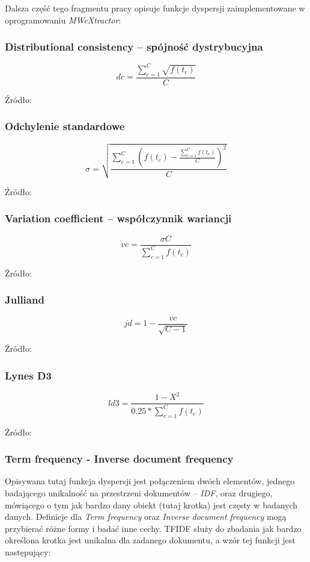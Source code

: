Dalsza część tego fragmentu pracy opisuje funkcje dyspersji zaimplementowane w oprogramowaniu \emph{MWeXtractor}:

\subsubsection{Distributional consistency -- spójność dystrybucyjna}

$$ dc = \frac{ \sum_{c=1}^{C} \sqrt{f(t_{c})} }{C} $$

Źródło: \cite[str. 7]{dispersions}

\subsubsection{Odchylenie standardowe}

$$ \sigma = \sqrt{\frac{\sum_{c=1}^{C}(f(t_{c}) - \frac{ \sum_{c=1}^{C} f(t_{c}) }{C} )^2}{C}} $$

Źródło: \cite[str. 6]{dispersions}

\subsubsection{Variation coefficient -- współczynnik wariancji}

$$ vc = \frac{\sigma C}{\sum_{c=1}^{C} f(t_{c})} $$

Źródło: \cite[str. 6]{dispersions}

\subsubsection{Julliand}

$$ jd = 1 - \frac{vc}{\sqrt{C-1}} $$

Źródło: \cite[str. 6]{dispersions}

\subsubsection{Lynes D3}

$$ ld3 = \frac{ 1 - X^{2} }{ 0.25 * \sum_{c=1}^{C} f(t_{c}) } $$

Źródło: \cite[str. 7]{dispersions}

\subsubsection{Term frequency - Inverse document frequency}
Opisywana tutaj funkcja dyspersji jest połączeniem dwóch elementów, jednego badającego unikalność na przestrzeni dokumentów -- \emph{IDF}, oraz drugiego, mówiącego o tym jak bardzo dany obiekt (tutaj krotka) jest częsty w badanych danych.
Definicje dla \emph{Term frequency} oraz \emph{Inverse document frequency} mogą przybierać różne formy i badać inne cechy.
TFIDF służy do zbadania jak bardzo określona krotka jest unikalna dla zadanego dokumentu, a wzór tej funkcji jest następujący:

